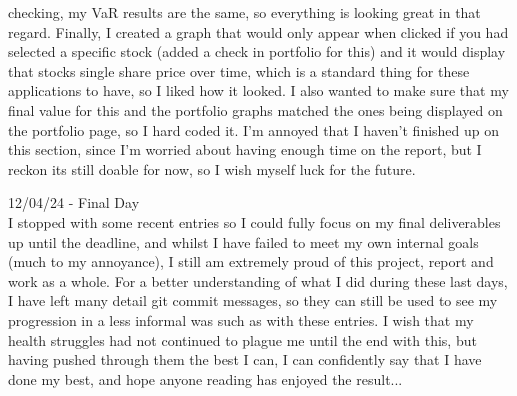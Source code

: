 \documentclass{article}
\begin{document}
checking, my VaR results are the same, so everything is looking great in that regard. Finally, I created a graph that would only appear when clicked if you had selected a specific stock (added a check in portfolio for this) and it would display that stocks single share price over time, which is a standard thing for these applications to have, so I liked how it looked. I also wanted to make sure that my final value for this and the portfolio graphs matched the ones being displayed on the portfolio page, so I hard coded it. I'm annoyed that I haven't finished up on this section, since I'm worried about having enough time on the report, but I reckon its still doable for now, so I wish myself luck for the future.\\\vspace{0.3cm}

12/04/24 - Final Day\\
I stopped with some recent entries so I could fully focus on my final deliverables up until the deadline, and whilst I have failed to meet my own internal goals (much to my annoyance), I still am extremely proud of this project, report and work as a whole. For a better understanding of what I did during these last days, I have left many detail git commit messages, so they can still be used to see my progression in a less informal was such as with these entries. I wish that my health struggles had not continued to plague me until the end with this, but having pushed through them the best I can, I can confidently say that I have done my best, and hope anyone reading has enjoyed the result...\\\vspace{0.3cm}
\end{document}
